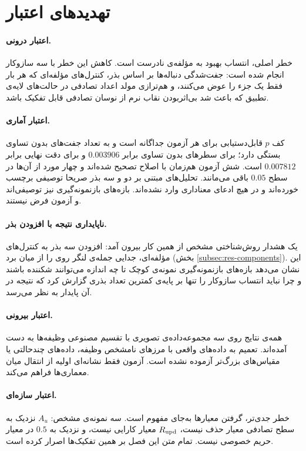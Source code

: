 \section{تهدیدهای اعتبار}
\label{sec:res-threats}

\paragraph{اعتبار درونی.} خطر اصلی، انتساب بهبود به مؤلفه‌ی نادرست است. کاهش این خطر با سه سازوکار انجام شده است: جفت‌شدگی دنباله‌ها بر اساس بذر، کنترل‌های مؤلفه‌ای که هر بار فقط یک جزء را عوض می‌کنند، و هم‌ترازی مولد اعداد تصادفی در حالت‌های لایه‌ی تطبیق که باعث شد بی‌اثربودن نقاب نرم از نوسان تصادفی قابل تفکیک باشد.

\paragraph{اعتبار آماری.} کف $p$ قابل‌دستیابی برای هر آزمون جداگانه است و به تعداد جفت‌های بدون تساوی بستگی دارد؛ برای سطرهای بدون تساوی  برابر $0.003906$ و برای دقت نهایی  برابر $0.007812$ است. شش آزمون هم‌زمان با اصلاح  تصحیح شده‌اند و چهار مورد از آن‌ها در سطح $0.05$ باقی می‌مانند. تحلیل‌های مبتنی بر دو و سه بذر صریحا توصیفی برچسب خورده‌اند و در هیچ ادعای معناداری وارد نشده‌اند. بازه‌های بازنمونه‌گیری نیز توصیفی‌اند و آزمون فرض نیستند.

\paragraph{ناپایداری نتیجه با افزودن بذر.} یک هشدار روش‌شناختی مشخص از همین کار بیرون آمد: افزودن سه بذر به کنترل‌های مؤلفه‌ای، جدایی جمله‌ی لنگر روی  را از میان برد (بخش \ref{subsec:res-components}). این نشان می‌دهد بازه‌های بازنمونه‌گیری نمونه‌ی کوچک تا چه اندازه می‌توانند شکننده باشند و چرا نباید انتساب سازوکار را تنها بر پایه‌ی کمترین تعداد بذری گزارش کرد که نتیجه در آن پایدار به نظر می‌رسد.

\paragraph{اعتبار بیرونی.} همه‌ی نتایج روی سه مجموعه‌داده‌ی تصویری با تقسیم مصنوعی وظیفه‌ها به دست آمده‌اند. تعمیم به داده‌های واقعی با مرزهای نامشخص وظیفه، داده‌های چندحالتی یا مقیاس‌های بزرگ‌تر آزموده نشده است. آزمون  فقط نشانه‌ای اولیه از انتقال میان معماری‌ها فراهم می‌کند.

\paragraph{اعتبار سازه‌ای.} خطر جدی‌تر، گرفتن معیارها به‌جای مفهوم است. سه نمونه‌ی مشخص: $A_u$ نزدیک به سطح تصادفی معیار حذف نیست، $R_{\mathrm{upd}}$ معیار کارایی نیست، و  نزدیک به $0.5$ در  معیار حریم خصوصی نیست. تمام متن این فصل بر همین تفکیک‌ها اصرار کرده است.

